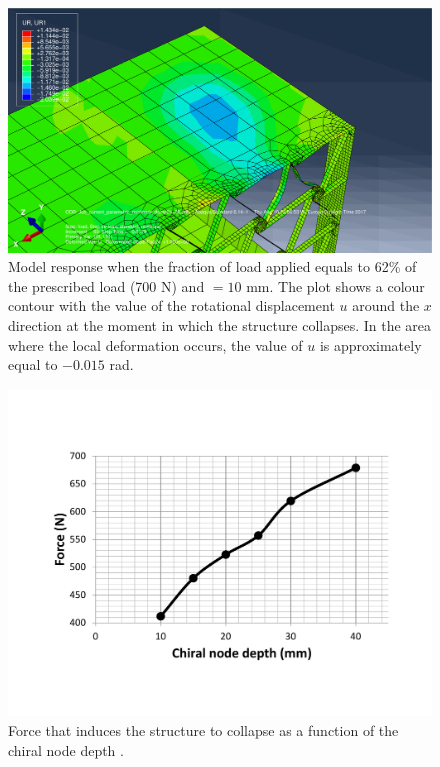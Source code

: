       \begin{figure}[!htpb] %
        \centering
        \includegraphics[width=0.8 \textwidth]{figures/../figures/result-sim/B/10_UR1}
        \caption[Model response when the fraction of load applied equals to 62\% of the prescribed load (700 N) and \chiB$= 10$ mm]{Model response when the fraction of load applied equals to 62\% of the prescribed load (700 N) and \chiB$= 10$ mm. The plot shows a colour contour with the value of the rotational displacement $u$ around the $x$ direction at the moment in which the structure collapses. In the area where the local deformation occurs, the value of $u$ is approximately equal to $-0.015$ rad.}
        \label{fig:10_UR1}
      \end{figure}

      \begin{figure}[!htpb] %
        \centering
        \includegraphics[width=0.8 \textwidth]{figures/../figures/result-sim/B/force_B}
        \caption[Force that induces the structure to collapse as a function of the chiral node depth]{Force that induces the structure to collapse as a function of the chiral node depth \chiB.}\label{fig:force_B}
      \end{figure}

